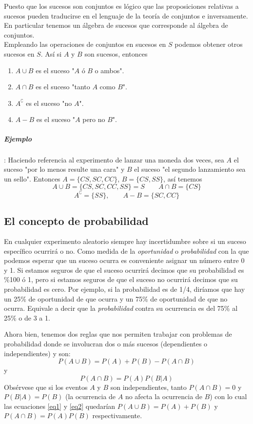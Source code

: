 \documentclass[letterpaper]{article}
\begin{document}
\begin{multicols}{2}
Puesto que los sucesos son conjuntos es lógico que las
proposiciones relativas a sucesos pueden traducirse en el lenguaje de la teoría de conjuntos e inversamente. En particular tenemos un álgebra de sucesos que corresponde al álgebra de conjuntos.\\

Empleando las operaciones de conjuntos en sucesos en $S$ podemos obtener otros sucesos en $S$. Así si $A$ y $B$ son sucesos, entonces
\begin{enumerate}
\item $A\cup B$ es el suceso "$A$ ó $B$ o ambos".
\item $A\cap B$ es el suceso "tanto $A$ como $B$".
\item $A^{\complement}$ es el suceso "no $A$".
\item $A-B$ es el suceso "$A$ pero no $B$".
\end{enumerate}
\subparagraph*{Ejemplo}: Haciendo referencia al experimento de lanzar una moneda dos veces, sea $A$ el suceso "por lo menos resulte una cara" y $B$ el suceso "el segundo lanzamiento sea un sello". Entonces $A=\{CS,SC,CC\}$, $B=\{CS,SS\}$, así tenemos
\[A\cup B=\{CS,SC,CC,SS\}=S\qquad A\cap B=\{CS\}\]
\[A^{\complement}=\{SS\}, \qquad A-B=\{SC,CC\}\]
\subsection*{El concepto de probabilidad}
En cualquier experimento aleatorio siempre hay incertidumbre sobre si un suceso específico ocurrirá o no. Como medida de la \emph{oportunidad} o \emph{probabilidad} con la que podemos esperar que un suceso ocurra es conveniente asignar un número entre 0 y 1. Si estamos seguros de que el suceso ocurrirá decimos que su probabilidad es \%100 ó 1, pero si estamos seguros de que el suceso no ocurrirá decimos que su probabilidad es cero. Por ejemplo, si la probabilidad es de 1/4, diríamos que hay un 25\% de oportunidad de que ocurra y un 75\% de oportunidad de que no ocurra. Equivale a decir que la \emph{probabilidad} contra su ocurrencia es del 75\% al 25\% o de 3 a 1.

Ahora bien, tenemos dos reglas que nos permiten trabajar con problemas de probabilidad donde se involucran dos o más sucesos (dependientes o independientes) y son:
\begin{equation}
P(A\cup B)=P(A)+P(B)-P(A\cap B)\label{eq1}
\end{equation}
y
\begin{equation}
P(A\cap B)=P(A)P(B|A) \label{eq2}
\end{equation}
Obsérvese que si los eventos $A$ y $B$ son independientes, tanto $P(A\cap B)=0$ y $P(B|A)=P(B)$ (la ocurrencia de $A$ no afecta la ocurrencia de $B$) con lo cual las ecuaciones \ref{eq1} y \ref{eq2} quedarían $P(A\cup B)=P(A)+P(B)$ y $P(A\cap B)=P(A)P(B)$ respectivamente.

\end{multicols}
\end{document}
